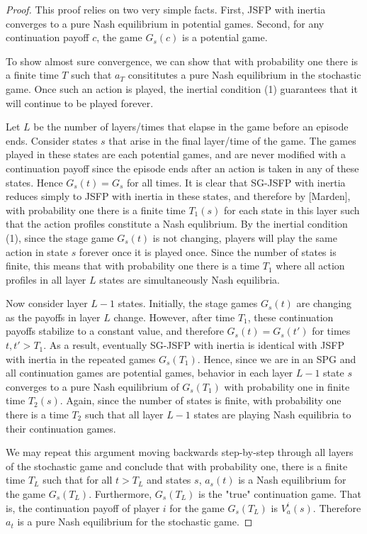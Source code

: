\begin{proof}

This proof relies on two very simple facts. First, JSFP with inertia converges to a pure Nash equilibrium in potential games. Second, for any continuation payoff $c$, the game $G_s(c)$ is a potential game.

To show almost sure convergence, we can show that with probability one there is a finite time $T$ such that $a_T$ consititutes a pure Nash equilibrium in the stochastic game. Once such an action is played, the inertial condition (1) guarantees that it will continue to be played forever.

Let $L$ be the number of layers/times that elapse in the game before an episode ends. Consider states $s$ that arise in the final layer/time of the game. The games played in these states are each potential games, and are never modified with a continuation payoff since the episode ends after an action is taken in any of these states. Hence $G_s(t) = G_s$ for all times. It is clear that SG-JSFP with inertia reduces simply to JSFP with inertia in these states, and therefore by [Marden], with probability one there is a finite time $T_1(s)$ for each state in this layer such that the action profiles constitute a Nash equlibrium. By the inertial condition (1), since the stage game $G_s(t)$ is not changing, players will play the same action in state $s$ forever once it is played once. Since the number of states is finite, this means that with probability one there is a time $T_1$ where all action profiles in all layer $L$ states are simultaneously Nash equilibria.

Now consider layer $L-1$ states. Initially, the stage games $G_s(t)$ are changing as the payoffs in layer $L$ change. However, after time $T_1$, these continuation payoffs stabilize to a constant value, and therefore $G_s(t) = G_s(t')$ for times $t, t' > T_1$. As a result, eventually SG-JSFP with inertia is identical with JSFP with inertia in the repeated games $G_s(T_1)$. Hence, since we are in an SPG and all continuation games are potential games, behavior in each layer $L-1$ state $s$ converges to a pure Nash equilibrium of $G_s(T_1)$ with probability one in finite time $T_2(s)$. Again, since the number of states is finite, with probability one there is a time $T_2$ such that all layer $L-1$ states are playing Nash equilibria to their continuation games.

We may repeat this argument moving backwards step-by-step through all layers of the stochastic game and conclude that with probability one, there is a finite time $T_L$ such that for all $t > T_L$ and states $s$, $a_s(t)$ is a Nash equilibrium for the game $G_s(T_L)$. Furthermore, $G_s(T_L)$ is the "true" continuation game. That is, the continuation payoff of player $i$ for the game $G_s(T_L)$ is $V^i_{a}(s)$. Therefore $a_t$ is a pure Nash equilibrium for the stochastic game.



\end{proof}


